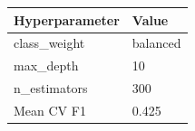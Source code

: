 \begin{tabular}{ll}
\toprule
Hyperparameter & Value \\
\midrule
class\_weight & balanced \\
max\_depth & 10 \\
n\_estimators & 300 \\
\midrule
Mean CV F1 & 0.425 \\
\bottomrule
\end{tabular}
